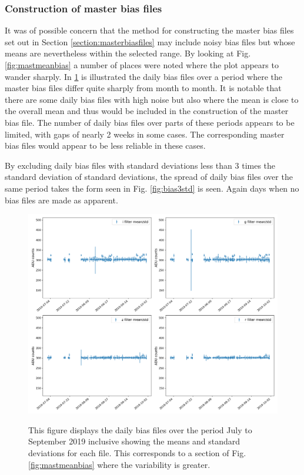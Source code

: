 \subsubsection{Construction of master bias files}
\protect\label{section:mastbiasconstr}

It was of possible concern that the method for constructing the master bias
files set out in Section \ref{section:masterbiasfiles} may include noisy bias
files but whose means are nevertheless within the selected range. By looking at
Fig. \ref{fig:mastmeanbias} a number of places were noted where the plot appears
to wander sharply. In \ref{fig:ibiasnolim} is illustrated the daily bias files
over a period where the master bias files differ quite sharply from month to
month. It is notable that there are some daily bias files with high noise but
also where the mean is close to the overall mean and thus would be included in
the construction of the master bias file. The number of daily bias files over
parts of these periods appears to be limited, with gaps of nearly 2 weeks in
some cases. The corresponding master bias files would appear to be less
reliable in these cases.

By excluding daily bias files with standard deviations less than 3 times the
standard deviation of standard deviations, the spread of daily bias files over
the same period takes the form seen in Fig. \ref{fig:bias3std} is seen. Again
days when no bias files are made as apparent.

\begin{figure}[!htbp]
\begin{center}
\includegraphics[scale=0.4]{images/ibiasnolim.png}
\end{center}   
\caption{This figure displays the daily bias files over the period July to
September 2019 inclusive showing the means and standard deviations for each
file. This corresponds to a section of Fig. \ref{fig:mastmeanbias} where
the variability is greater.} \protect\label{fig:ibiasnolim}
\end{figure}

